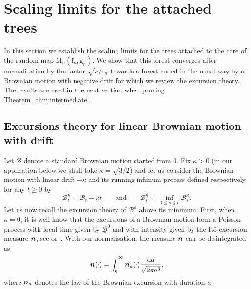 \documentclass[10pt]{amsart}
\newcommand{\bmn}{\protect\boldsymbol{n}}
\theoremstyle{plain}
\theoremstyle{definition}
\theoremstyle{remark}
\renewcommand{\d}{\mathop{}\!\mathrm{d}}
\newcommand{\Map}{\mathrm{M}}
\newcommand{\face}{\mathrm{f}}
\newcommand{\gen}{\mathrm{g}}
\newcommand{\spar}{\mathrm{s}}
\begin{document}
\section{Scaling limits for the attached trees}
\label{sec:contour}

In this section we establish the scaling limits for the trees attached to the core of the random map $\Map_n(\face_n, \gen_n)$.
We show that this forest converges after normalisation by the factor $ \sqrt{n/\spar_n}$ towards a forest coded in the usual way by a Brownian motion with negative drift for which we review the excursion theory. The results are used in the next section when proving Theorem~\ref{thm:intermediate}.

\subsection{Excursions theory for linear Brownian motion with drift}
\label{sec:excursionBMD}

Let $\mathcal{B}$ denote a standard Brownian motion started from $0$. Fix $\kappa >0$ (in our application below we shall take $\kappa = \sqrt{3/2}$) and let us consider the Brownian motion with linear drift $-\kappa$ and its running infimum process defined respectively for any $t \ge 0$ by
\[
\mathcal{B}^{\kappa}_{t} = \mathcal{B}_{t}-\kappa t
\qquad\text{and}\qquad
\underline{\mathcal{B}}^{\kappa}_{t} = \inf_{0 \leq s\leq t} \mathcal{B}^{\kappa}_{s}.
\]
Let us now recall the excursion theory of $\mathcal{B}^{\kappa}$ above its minimum.
First, when $\kappa=0$, it is well know that the excursions of a Brownian motion form a Poisson process with local time given by $\underline{\mathcal{B}}^{0}$ and with intensity given by the It\={o} excursion measure $\bmn$, see \eg \cite{LG10} or~\cite[Chap.\,XII]{RY99}. With our normalisation, the measure $\bmn$ can be disintegrated as
\[
\bmn(\cdot) = \int_0^\infty \bmn_a(\cdot) \frac{\d a}{\sqrt{2\pi a^3}},
\]
where $\bmn_a$ denotes the law of the Brownian excursion with duration $a$.
\end{document}
